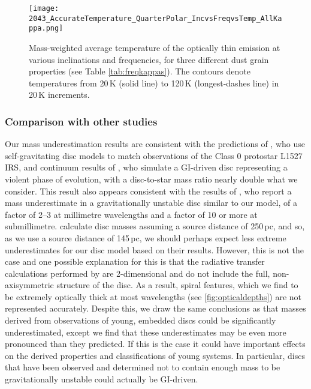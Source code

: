 \documentclass[fleqn,usenatbib]{mnras}
\begin{document}
\begin{figure*}
    \texttt{[image: 2043\_AccurateTemperature\_QuarterPolar\_IncvsFreqvsTemp\_AllKappa.png]}
    \caption{Mass-weighted average temperature of the optically thin emission at various inclinations and frequencies, for three different dust grain properties (see Table \ref{tab:freqkappas}). The contours denote temperatures from 20\,K (solid line) to 120\,K (longest-dashes line) in 20\,K increments.}
    \label{fig:accuratetemps}
\end{figure*}

\subsubsection{Comparison with other studies}

Our mass underestimation results are consistent with the predictions of \citet{Forgan&Rice2013}, who use self-gravitating disc models to match observations of the Class 0 protostar L1527 IRS, and continuum results of \citet{Douglas&Caselli2013}, who simulate a GI-driven disc representing a violent phase of evolution, with a disc-to-star mass ratio nearly double what we consider. This result also appears consistent with the results of \citet{Dunham&Vorobyov2014}, who report a mass underestimate in a gravitationally unstable disc similar to our model, of a factor of 2--3 at millimetre wavelengths and a factor of 10 or more at submillimetre. \citet{Dunham&Vorobyov2014} calculate disc masses assuming a source distance of 250\,pc, and so, as we use a source distance of 145\,pc, we should perhaps expect less extreme underestimates for our disc model based on their results. However, this is not the case and one possible explanation for this is that the radiative transfer calculations performed by \citet{Dunham&Vorobyov2014} are 2-dimensional and do not include the full, non-axisymmetric structure of the disc. As a result, spiral features, which we find to be extremely optically thick at most wavelengths (see \autoref{fig:opticaldepths}) are not represented accurately. Despite this, we draw the same conclusions as 
\citet{Dunham&Vorobyov2014} that masses derived from observations of young, embedded discs could be significantly underestimated, except we find that these underestimates may be even more pronounced than they predicted. If this is the case it could have important effects on the derived properties and classifications of young systems. In particular, discs that have been observed and determined not to contain enough mass to be gravitationally unstable could actually be GI-driven.
\end{document}
